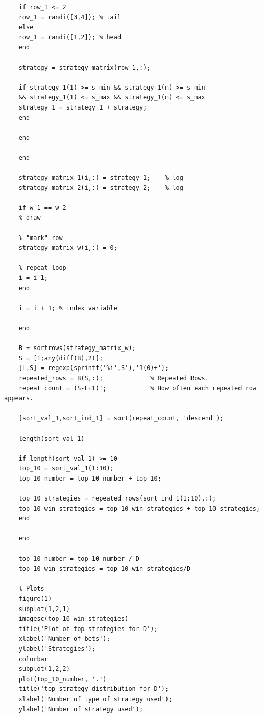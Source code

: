 \documentclass[11pt]{article}
\begin{document}
\begin{lstlisting}
	if row_1 <= 2
	row_1 = randi([3,4]); % tail
	else
	row_1 = randi([1,2]); % head
	end
	
	strategy = strategy_matrix(row_1,:);
	
	if strategy_1(1) >= s_min && strategy_1(n) >= s_min 
	&& strategy_1(1) <= s_max && strategy_1(n) <= s_max
	strategy_1 = strategy_1 + strategy;
	end
	
	end
	
	end
	
	strategy_matrix_1(i,:) = strategy_1;    % log
	strategy_matrix_2(i,:) = strategy_2;    % log
	
	if w_1 == w_2
	% draw
	
	% "mark" row
	strategy_matrix_w(i,:) = 0;
	
	% repeat loop
	i = i-1;
	end
	
	i = i + 1; % index variable
	
	end
	
	B = sortrows(strategy_matrix_w);
	S = [1;any(diff(B),2)];
	[L,S] = regexp(sprintf('%i',S'),'1(0)+');
	repeated_rows = B(S,:);             % Repeated Rows.
	repeat_count = (S-L+1)';            % How often each repeated row appears.
	
	[sort_val_1,sort_ind_1] = sort(repeat_count, 'descend');
	
	length(sort_val_1)
	
	if length(sort_val_1) >= 10
	top_10 = sort_val_1(1:10);
	top_10_number = top_10_number + top_10;
	
	top_10_strategies = repeated_rows(sort_ind_1(1:10),:);
	top_10_win_strategies = top_10_win_strategies + top_10_strategies;
	end
	
	end
	
	top_10_number = top_10_number / D
	top_10_win_strategies = top_10_win_strategies/D
	
	% Plots
	figure(1)
	subplot(1,2,1)
	imagesc(top_10_win_strategies)
	title('Plot of top strategies for D');
	xlabel('Number of bets');
	ylabel('Strategies');
	colorbar
	subplot(1,2,2)
	plot(top_10_number, '.')
	title('top strategy distribution for D');
	xlabel('Number of type of strategy used');
	ylabel('Number of strategy used');
\end{lstlisting}
\vspace{10mm}
\end{document}
